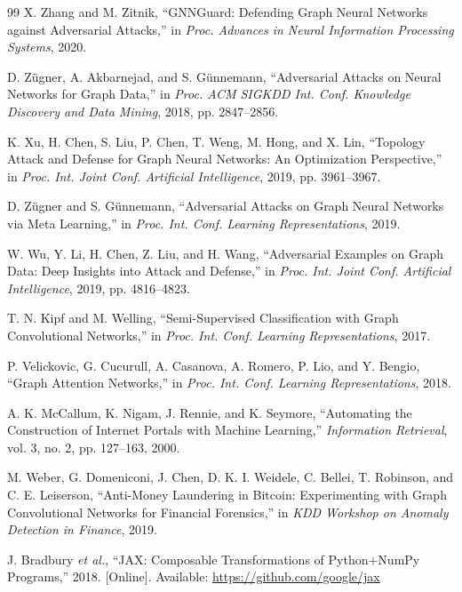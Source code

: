 \documentclass[12pt,oneside]{report}
\begin{document}
\clearpage
\renewcommand{\bibname}{References}
\begin{singlespace}
\begin{thebibliography}{99}
X. Zhang and M. Zitnik, ``GNNGuard: Defending Graph Neural Networks against Adversarial Attacks,'' in \textit{Proc. Advances in Neural Information Processing Systems}, 2020.

D. Z\"ugner, A. Akbarnejad, and S. G\"unnemann, ``Adversarial Attacks on Neural Networks for Graph Data,'' in \textit{Proc. ACM SIGKDD Int. Conf. Knowledge Discovery and Data Mining}, 2018, pp. 2847--2856.

K. Xu, H. Chen, S. Liu, P. Chen, T. Weng, M. Hong, and X. Lin, ``Topology Attack and Defense for Graph Neural Networks: An Optimization Perspective,'' in \textit{Proc. Int. Joint Conf. Artificial Intelligence}, 2019, pp. 3961--3967.

D. Z\"ugner and S. G\"unnemann, ``Adversarial Attacks on Graph Neural Networks via Meta Learning,'' in \textit{Proc. Int. Conf. Learning Representations}, 2019.

W. Wu, Y. Li, H. Chen, Z. Liu, and H. Wang, ``Adversarial Examples on Graph Data: Deep Insights into Attack and Defense,'' in \textit{Proc. Int. Joint Conf. Artificial Intelligence}, 2019, pp. 4816--4823.

T. N. Kipf and M. Welling, ``Semi-Supervised Classification with Graph Convolutional Networks,'' in \textit{Proc. Int. Conf. Learning Representations}, 2017.

P. Velickovic, G. Cucurull, A. Casanova, A. Romero, P. Lio, and Y. Bengio, ``Graph Attention Networks,'' in \textit{Proc. Int. Conf. Learning Representations}, 2018.

A. K. McCallum, K. Nigam, J. Rennie, and K. Seymore, ``Automating the Construction of Internet Portals with Machine Learning,'' \textit{Information Retrieval}, vol. 3, no. 2, pp. 127--163, 2000.

M. Weber, G. Domeniconi, J. Chen, D. K. I. Weidele, C. Bellei, T. Robinson, and C. E. Leiserson, ``Anti-Money Laundering in Bitcoin: Experimenting with Graph Convolutional Networks for Financial Forensics,'' in \textit{KDD Workshop on Anomaly Detection in Finance}, 2019.

J. Bradbury \textit{et al.}, ``JAX: Composable Transformations of Python+NumPy Programs,'' 2018. [Online]. Available: \url{https://github.com/google/jax}


\end{thebibliography}
\end{singlespace}
\end{document}
